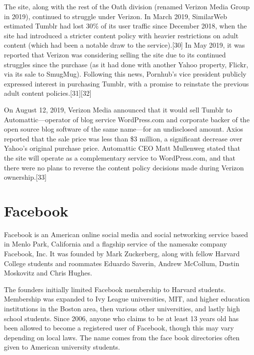 \documentclass[12pt]{article}
\begin{document}
The site, along with the rest of the Oath division (renamed Verizon Media Group in 2019), continued to struggle under Verizon. In March 2019, SimilarWeb estimated Tumblr had lost 30\% of its user traffic since December 2018, when the site had introduced a stricter content policy with heavier restrictions on adult content (which had been a notable draw to the service).[30] In May 2019, it was reported that Verizon was considering selling the site due to its continued struggles since the purchase (as it had done with another Yahoo property, Flickr, via its sale to SmugMug). Following this news, Pornhub's vice president publicly expressed interest in purchasing Tumblr, with a promise to reinstate the previous adult content policies.[31][32]

On August 12, 2019, Verizon Media announced that it would sell Tumblr to Automattic—operator of blog service WordPress.com and corporate backer of the open source blog software of the same name—for an undisclosed amount. Axios reported that the sale price was less than \$3 million, a significant decrease over Yahoo's original purchase price. Automattic CEO Matt Mullenweg stated that the site will operate as a complementary service to WordPress.com, and that there were no plans to reverse the content policy decisions made during Verizon ownership.[33] 









\newpage

\section{Facebook}



Facebook is an American online social media and social networking service based in Menlo Park, California and a flagship service of the namesake company Facebook, Inc. It was founded by Mark Zuckerberg, along with fellow Harvard College students and roommates Eduardo Saverin, Andrew McCollum, Dustin Moskovitz and Chris Hughes.

The founders initially limited Facebook membership to Harvard students. Membership was expanded to Ivy League universities, MIT, and higher education institutions in the Boston area, then various other universities, and lastly high school students. Since 2006, anyone who claims to be at least 13 years old has been allowed to become a registered user of Facebook, though this may vary depending on local laws. The name comes from the face book directories often given to American university students.
\end{document}
